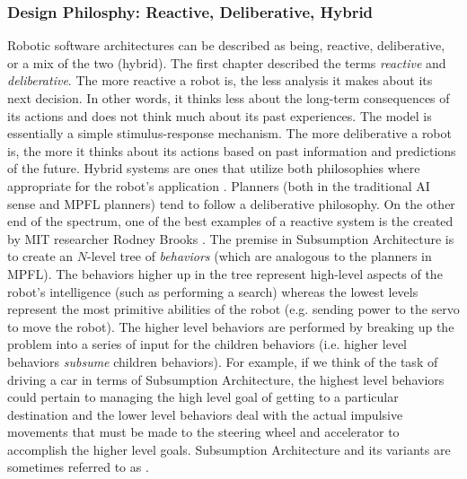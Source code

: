 \subsubsection{Design Philosphy: Reactive, Deliberative, Hybrid}
Robotic software architectures can be described as being, reactive, deliberative, or a mix of the two (hybrid). The first chapter described the terms \emph{reactive} and \emph{deliberative}. The more reactive a robot is, the less analysis it makes about its next decision. In other words, it thinks less about the long-term consequences of its actions and does not think much about its past experiences. The model is essentially a simple stimulus-response mechanism. The more deliberative a robot is, the more it thinks about its actions based on past information and predictions of the future. Hybrid systems are ones that utilize both philosophies where appropriate for the robot's application \citep{alami:archforautonomy, gat:onthreelayer}. Planners (both in the traditional AI sense and MPFL planners) tend to follow a deliberative philosophy. On the other end of the spectrum, one of the best examples of a reactive system is the  created by MIT researcher Rodney Brooks \citep{brooks:subsumption, brooks:newapproach}. The premise in Subsumption Architecture is to create an $N$-level tree of \textit{behaviors} (which are analogous to the planners in MPFL). The behaviors higher up in the tree represent high-level aspects of the robot's intelligence (such as performing a search) whereas the lowest levels represent the most primitive abilities of the robot (e.g. sending power to the servo to move the robot). The higher level behaviors are performed by breaking up the problem into a series of input for the children behaviors (i.e. higher level behaviors \textit{subsume} children behaviors). For example, if we think of the task of driving a car in terms of Subsumption Architecture, the highest level behaviors could pertain to managing the high level goal of getting to a particular destination and the lower level behaviors deal with the actual impulsive movements that must be made to the steering wheel and accelerator to accomplish the higher level goals. Subsumption Architecture and its variants are sometimes referred to as  \citep{arkin:behaviorbasedrobotics}.

